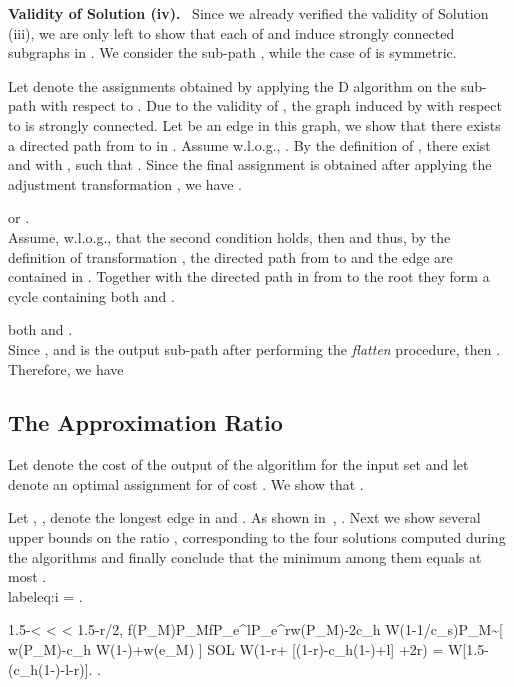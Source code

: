 \documentclass[a4paper]{article}
\begin{document}
\begin{algorithm}[htp]
\begin{algorithmic}
\noindent
\textbf{Validity of Solution (iv).} \
Since we already verified the validity of Solution (iii), 
we are only left to show that each of  and  induce strongly connected subgraphs in .
We consider the sub-path , while the case of  is symmetric.

Let  denote the assignments obtained by applying 
the D algorithm on the sub-path  with respect to .
Due to the validity of , the graph induced by  with respect to 
is strongly connected.
Let  be an edge in this graph, we show that there exists a directed path from  to  in . 
Assume w.l.o.g., .
By the definition of , there exist  and 
with , such that .
Since the final assignment  is obtained after applying the adjustment transformation ,
we have .
\begin{description}[topsep=0.2cm, itemsep=0.1cm]
\item[Case 1:]  or .\\
							 Assume, w.l.o.g., that the second condition holds, then  
							 and thus, by the definition of transformation , 
							 the directed path from  to  and the edge  are contained in .
							 Together with the directed path in  from  to the root  they form a cycle containing both  and .
\item[Case 2:] both  and .\\
							 Since , and  is the output sub-path after performing
							 the \emph{flatten} procedure, then .
							 Therefore, we have
							 
					
\end{description}




\subsection{The Approximation Ratio}

Let  denote the cost of the output of the algorithm for the input set 
and let  denote an optimal assignment for  of cost .
We show that .

Let , ,  denote the longest edge in 
and .
As shown in~\cite{Ambuhl05}, .
Next we show several upper bounds on the ratio , 
corresponding to the four solutions computed during the algorithms and finally conclude that the minimum
among them equals at most .\\label{eq:i}
 \leq {} = .

1.5-\epsilon <  <  < 1.5-r/2,  f(P_M)P_MfP_{e^l}P_{e^r}w(P_M)-2c_h W(1-1/c_s)P_M\sim  {}[ w(P_M)-c_h W(1-)+w(e_M) ]     SOL \leq  W(1-r+ [(1-r)-c_h(1-)+l] +2r)
		 =  	W[1.5-\frac{1}{2}(c_h(1-\frac{1}{c_s})-l-r)]. \label{eq:ii}
\frac{SOL}{OPT} \leq {}.


\end{algorithmic}
\end{algorithm}
\end{document}
